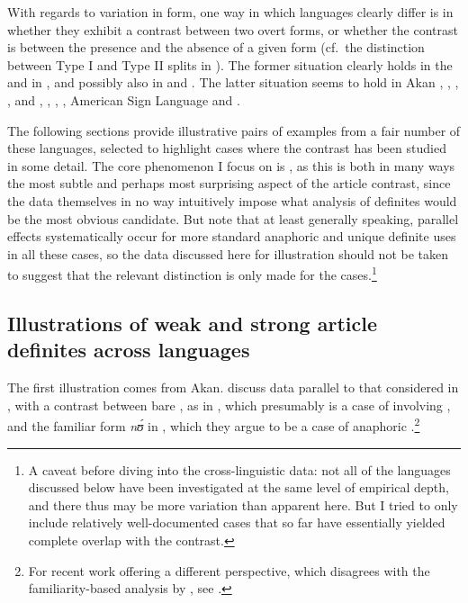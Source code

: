 \documentclass[output=paper
,modfonts
,nonflat]{langscibook}
\begin{document}
With regards to variation in form, one way in which languages clearly
differ is in whether they exhibit a contrast between two overt forms,
or whether the contrast is between the presence and the absence
of a given form (cf.\ the distinction between Type I and Type II splits
in \citealt{Ortmann2014}). The former situation clearly holds in the  and in  \citep{Ingason2016}, and possibly also in
 and  \citep[for discussion and references,
see][]{Schwarz2013}. The latter situation seems to hold
in  Akan \citep{ArkohMatthewson2013},
  \citep{Cho2016,Ahn2016}, 
  \citep{Wespel2008},
  \citep{Simek2016},
  and  \citep{Jenks2015},
  \citep{Ortmann2014},
   \citep{Ortmann2014},
  \citep{Grubic2016}, American Sign Language \citep{IraniSchwarz2016}
and  \citep{Sereikaite2016}. 

The following sections provide illustrative pairs of examples from
a fair number of these languages, selected to highlight cases where the contrast has been studied in some detail.
The core phenomenon I focus on is  , as this is
both in many ways the most subtle and perhaps most surprising aspect
of the article contrast, since the data themselves in no way intuitively
impose what analysis of definites would be the most obvious
candidate. But note that at least generally speaking, parallel
effects systematically occur for more standard anaphoric and unique
  definite uses in all these cases, so the data discussed here for
  illustration should not be
  taken to suggest that the relevant distinction is only made for the
   cases.\footnote{A caveat before diving into the cross-linguistic data: not all
of the languages discussed below have been investigated at the same
level of empirical depth, and there thus may be more variation than
apparent here. But I tried to only include relatively well-documented cases
that so far have essentially yielded complete overlap with the 
contrast.}


\subsection{Illustrations of weak and strong article definites across languages} 

The first illustration comes from Akan. \citet{ArkohMatthewson2013}
discuss data parallel to that considered in \citet{Schwarz2009}, with a contrast between bare , as in ,
which presumably is a case of  involving , and the familiar form \textit{n\'ʊ} in
, which they argue to be a case of anaphoric
.\footnote{For recent work offering a different perspective, which disagrees with
  the familiarity-based analysis by \citet{ArkohMatthewson2013}, see \citet{Bombi-Ferrer2017}.}
\end{document}

